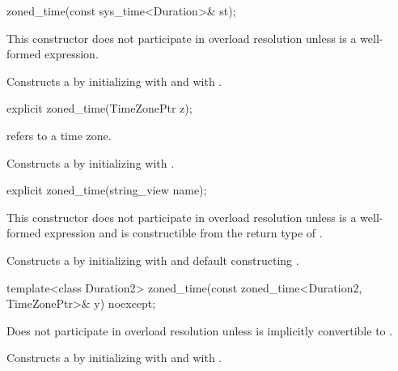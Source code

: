 \begin{itemdecl}
zoned_time(const sys_time<Duration>& st);
\end{itemdecl}

\begin{itemdescr}
\pnum
\remarks
This constructor does not participate in overload resolution unless
 is a well-formed expression.

\pnum
\effects
Constructs a  by
initializing  with  and  with .
\end{itemdescr}

\begin{itemdecl}
explicit zoned_time(TimeZonePtr z);
\end{itemdecl}

\begin{itemdescr}
\pnum
\requires {} refers to a time zone.

\pnum
\effects
Constructs a  by
initializing  with .
\end{itemdescr}

\begin{itemdecl}
explicit zoned_time(string_view name);
\end{itemdecl}

\begin{itemdescr}
\pnum
\remarks
This constructor does not participate in overload resolution unless
 is a well-formed expression and
 is constructible from the return type of .

\pnum
\effects
Constructs a  by
initializing  with  and
default constructing .
\end{itemdescr}

\begin{itemdecl}
template<class Duration2>
  zoned_time(const zoned_time<Duration2, TimeZonePtr>& y) noexcept;
\end{itemdecl}

\begin{itemdescr}
\pnum
\remarks
Does not participate in overload resolution unless
 is implicitly convertible to .

\pnum
\effects
Constructs a  by
initializing  with  and  with .
\end{itemdescr}

